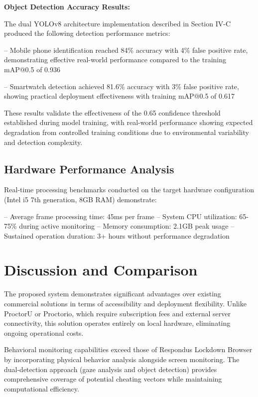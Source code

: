 \documentclass[conference]{IEEEtran}
\begin{document}
\textbf{Object Detection Accuracy Results:}

The dual YOLOv8 architecture implementation described in Section IV-C produced 
the following detection performance metrics:

-- Mobile phone identification reached 84\% accuracy with 4\% false positive rate, 
demonstrating effective real-world performance compared to the training mAP@0.5 of 0.936

-- Smartwatch detection achieved 81.6\% accuracy with 3\% false positive rate, 
showing practical deployment effectiveness with training mAP@0.5 of 0.617

These results validate the effectiveness of the 0.65 confidence threshold established 
during model training, with real-world performance showing expected degradation from 
controlled training conditions due to environmental variability and detection complexity.

\subsection{Hardware Performance Analysis}

Real-time processing benchmarks conducted on the target hardware configuration 
(Intel i5 7th generation, 8GB RAM) demonstrate:

-- Average frame processing time: 45ms per frame
-- System CPU utilization: 65-75\% during active monitoring
-- Memory consumption: 2.1GB peak usage
-- Sustained operation duration: 3+ hours without performance degradation

\section{Discussion and Comparison}

The proposed system demonstrates significant advantages over existing commercial solutions 
in terms of accessibility and deployment flexibility. Unlike ProctorU or Proctorio, which 
require subscription fees and external server connectivity\cite{proctoru}\cite{proctorio}, 
this solution operates entirely on local hardware, eliminating ongoing operational costs.

Behavioral monitoring capabilities exceed those of Respondus Lockdown Browser by incorporating 
physical behavior analysis alongside screen monitoring\cite{respondus}. The dual-detection 
approach (gaze analysis and object detection) provides comprehensive coverage of potential 
cheating vectors while maintaining computational efficiency.
\end{document}
